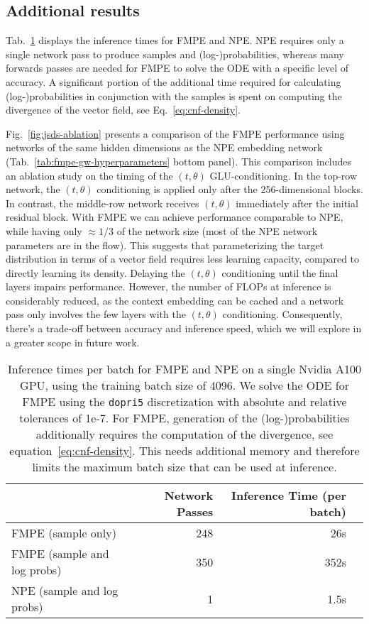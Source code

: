 \documentclass{article}
\theoremstyle{remark}
\begin{document}
\subsection{Additional results}\label{subsec:appendix-gw-results}
Tab.~\ref{tab:inference} displays the inference times for FMPE and NPE. NPE requires only a single network pass to produce samples and (log-)probabilities, whereas many forwards passes are needed for FMPE to solve the ODE with a specific level of accuracy. A significant portion of the additional time required for calculating (log-)probabilities in conjunction with the samples is spent on computing the divergence of the vector field, see Eq.~\eqref{eq:cnf-density}.

Fig.~\ref{fig:jsds-ablation} presents a comparison of the FMPE performance using networks of the same hidden dimensions as the NPE embedding network (Tab.~\ref{tab:fmpe-gw-hyperparameters} bottom panel). This comparison includes an ablation study on the timing of the $(t, \theta)$ GLU-conditioning. In the top-row network, the $(t, \theta)$ conditioning is applied only after the 256-dimensional blocks. In contrast, the middle-row network receives $(t, \theta)$ immediately after the initial residual block.
With FMPE we can achieve performance comparable to NPE, while having only  $\approx 1/3$ of the network size (most of the NPE network parameters are in the flow). This suggests that parameterizing the target distribution in terms of a vector field requires less learning capacity, compared to directly learning its density. Delaying the $(t, \theta)$ conditioning until the final layers impairs performance. However, the number of FLOPs at inference is considerably reduced, as the context embedding can be cached and a network pass only involves the few layers with the $(t, \theta)$ conditioning. Consequently, there's a trade-off between accuracy and inference speed, which we will explore in a greater scope in future work. 

\begin{table}[ht]
    \centering
    \caption{Inference times per batch for FMPE and NPE on a single Nvidia A100 GPU, using the training batch size of 4096. We solve the ODE for FMPE using the \texttt{dopri5} discretization \cite{DORMAND198019} with absolute and relative tolerances of 1e-7. For FMPE, generation of the (log-)probabilities additionally requires the computation of the divergence, see equation~\eqref{eq:cnf-density}. This needs additional memory and therefore limits the maximum batch size that can be used at inference.}
    \label{tab:inference}
    \begin{tabular}{@{}lrrr@{}}
    \toprule
        & Network Passes &  Inference Time (per batch) \\
    \midrule
   FMPE (sample only) &248  & 26s \\[0.5ex]
   FMPE (sample and log probs)  &350  &  352s\\[0.5ex]
    \midrule
   NPE (sample and log probs) & 1 & 1.5s\\[0.5ex]
    \bottomrule
    \end{tabular}
\end{table}
\end{document}
